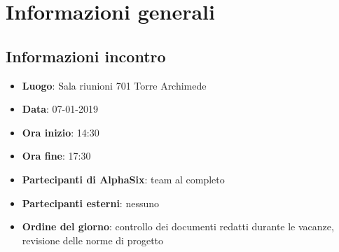 \newcommand{\documento}{\VI}
\newcommand{\nomedocumentofisico}{VI\_07-01-2018.pdf}
\newcommand{\redazione}{\SG}
\newcommand{\verifica}{\MM}
\newcommand{\approvazione}{\NC}
\newcommand{\versione}{1.0.0}
\newcommand{\uso}{Interno}
\newcommand{\destinateTo}{\TV, \\ & \RC, \\ & \II}
\newcommand{\datacreazione}{08 gennaio 2019}
\newcommand{\datamodifica}{09 gennaio 2019}
\newcommand{\stato}{Approvato}

\def\TABELLE{false}	%
\def\FIGURE{false} 	%






    

    	
    
    \section{Informazioni generali}
		\subsection{Informazioni incontro}
			\begin{itemize}
				\item { \textbf{Luogo}: Sala riunioni 701 Torre Archimede}
				\item { \textbf{Data}: 07-01-2019}
				\item { \textbf{Ora inizio}: 14:30}
				\item { \textbf{Ora fine}: 17:30}
				\item { \textbf{Partecipanti di AlphaSix}: team al completo}
				\item { \textbf{Partecipanti esterni}: nessuno}
				\item { \textbf{Ordine del giorno}: controllo dei documenti redatti durante le vacanze, revisione delle norme di progetto}
			\end{itemize}

